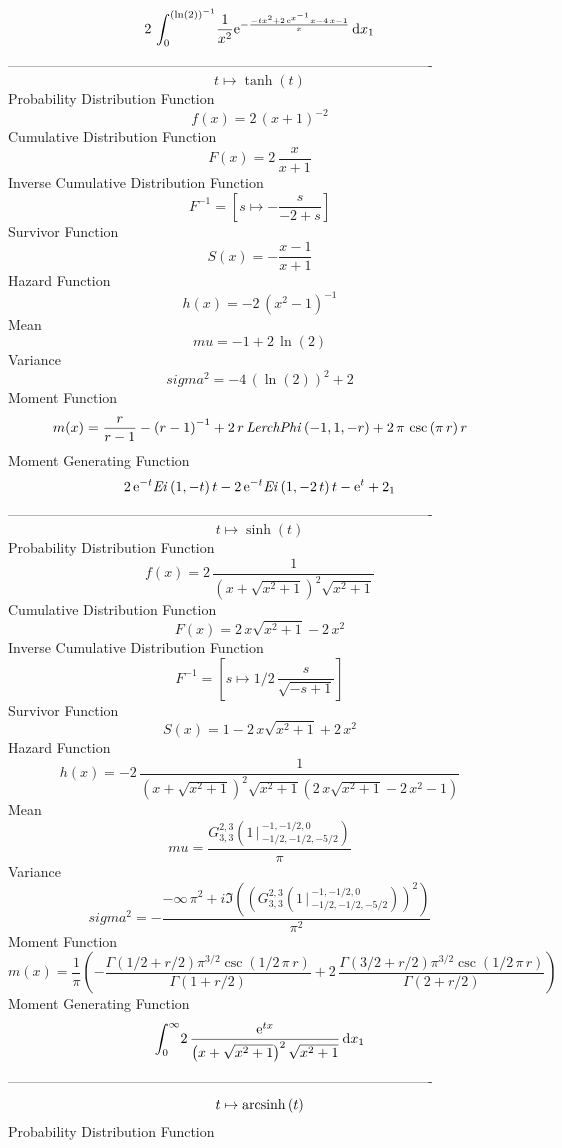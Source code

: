 \documentclass[12pt]{article}
\begin{document}
 $$2\,\int_{0}^{ \left( \ln  \left( 2 \right)  \right) ^{-1}}\!{\frac {1
}{{x}^{2}}{{\rm e}^{-{\frac {-t{x}^{2}+2\,{{\rm e}^{{x}^{-1}}}x-4\,x-1
}{x}}}}}\,{\rm d}x_{{1}}
$$-------------------------------------------------------------------------------------------  \\$$t\mapsto \tanh \left( t \right) 
$$Probability Distribution Function 
$$  f(x)=2\, \left( x+1 \right) ^{-2}
$$Cumulative Distribution Function  
 $$F(x)=2\,{\frac {x}{x+1}}
$$ Inverse Cumulative Distribution Function 
  $$F^{-1} = [s\mapsto -{\frac {s}{-2+s}}]
$$Survivor Function 
 $$ S(x)=-{\frac {x-1}{x+1}}
$$ Hazard Function 
 $$ h(x)=-2\, \left( {x}^{2}-1 \right) ^{-1}
$$Mean 
 $$ mu=-1+2\,\ln  \left( 2 \right) 
$$ Variance 
 $$ sigma^2 = -4\, \left( \ln  \left( 2 \right)  \right) ^{2}+2
$$Moment Function 
 $$ m(x) = {\frac {r}{r-1}}- \left( r-1 \right) ^{-1}+2\,r\,{\it LerchPhi}
 \left( -1,1,-r \right) +2\,\pi\,\csc \left( \pi\,r \right) r
$$ Moment Generating Function 
 $$2\,{{\rm e}^{-t}}{\it Ei} \left( 1,-t \right) t-2\,{{\rm e}^{-t}}{\it 
Ei} \left( 1,-2\,t \right) t-{{\rm e}^{t}}+2_{{1}}
$$-------------------------------------------------------------------------------------------  \\$$t\mapsto \sinh \left( t \right) 
$$Probability Distribution Function 
$$  f(x)=2\,{\frac {1}{ \left( x+\sqrt {{x}^{2}+1} \right) ^{2}\sqrt {{x}^{2}+1
}}}
$$Cumulative Distribution Function  
 $$F(x)=2\,x\sqrt {{x}^{2}+1}-2\,{x}^{2}
$$ Inverse Cumulative Distribution Function 
  $$F^{-1} =   
[s\mapsto 1/2\,{\frac {s}{\sqrt {-s+1}}}]
$$Survivor Function 
 $$ S(x)=1-2\,x\sqrt {{x}^{2}+1}+2\,{x}^{2}
$$ Hazard Function 
 $$ h(x)=-2\,{\frac {1}{ \left( x+\sqrt {{x}^{2}+1} \right) ^{2}\sqrt {{x}^{2}+
1} \left( 2\,x\sqrt {{x}^{2}+1}-2\,{x}^{2}-1 \right) }}
$$Mean 
 $$ mu={\frac {
G^{2, 3}_{3, 3}\left(1\, \Big\vert\,^{-1, -1/2, 0}_{-1/2, -1/2, -5/2}\right)
}{\pi}}
$$ Variance 
 $$ sigma^2 = -{\frac {-\infty \,{\pi}^{2}+i\Im \left(  \left( 
G^{2, 3}_{3, 3}\left(1\, \Big\vert\,^{-1, -1/2, 0}_{-1/2, -1/2, -5/2}\right)
 \right) ^{2} \right) }{{\pi}^{2}}}
$$Moment Function 
 $$ m(x) = {\frac {1}{\pi} \left( -{\frac {\Gamma \left( 1/2+r/2 \right) {\pi}^{3
/2}\csc \left( 1/2\,\pi\,r \right) }{\Gamma \left( 1+r/2 \right) }}+2
\,{\frac {\Gamma \left( 3/2+r/2 \right) {\pi}^{3/2}\csc \left( 1/2\,
\pi\,r \right) }{\Gamma \left( 2+r/2 \right) }} \right) }
$$ Moment Generating Function 
 $$\int_{0}^{\infty }\!2\,{\frac {{{\rm e}^{tx}}}{ \left( x+\sqrt {{x}^{2
}+1} \right) ^{2}\sqrt {{x}^{2}+1}}}\,{\rm d}x_{{1}}
$$-------------------------------------------------------------------------------------------  \\$$t\mapsto {\rm arcsinh} \left(t\right)
$$Probability Distribution Function 
\end{document}
